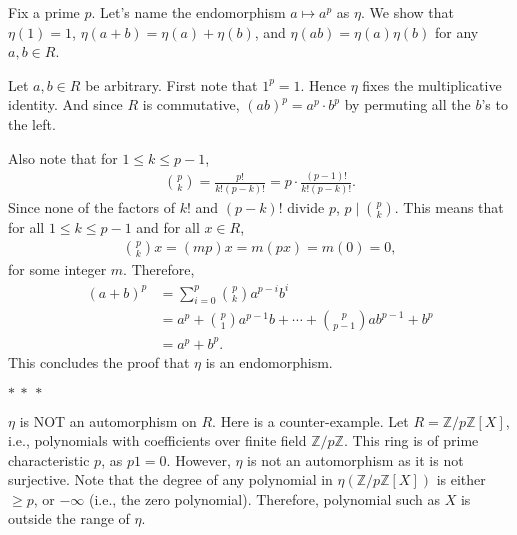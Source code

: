 \documentclass[12pt]{article}
\begin{document}
\begin{fproof}[Jacobson 2.7.4]
  Fix a prime \(p\).
  Let's name the endomorphism \(a \mapsto a^{p}\) as \(\eta\).
  We show that \(\eta(1) = 1\), \(\eta(a+b) = \eta(a)+ \eta(b)\), and \(\eta(ab) = \eta(a)\eta(b)\) for any \(a,b \in R\).

  Let \(a,b \in R\) be arbitrary.
  First note that \(1^p = 1\). Hence \(\eta\) fixes the multiplicative identity.
  And since \(R\) is commutative, \((ab)^p = a^p \cdot b^p\) by permuting all the \(b\)'s to the left.

  Also note that for \(1 \leq k \leq p-1\),
  \begin{align*}
    \binom{p}{k} = \frac{p!}{k!(p-k)!} = p \cdot \frac{(p-1)!}{k!(p-k)!}.
  \end{align*}
  Since none of the factors of \(k!\) and \((p-k)!\) divide \(p\), \(p \mid \binom{p}{k}\). This means that for all \(1 \leq k \leq p-1\) and for all \(x \in R\),
  \begin{align*}
    \binom{p}{k}x = (mp)x = m(px) = m(0) = 0,
  \end{align*}
  for some integer \(m\).
  Therefore,
  \begin{align*}
    (a+b)^p &= \sum_{i=0}^{p} \binom{p}{k} a^{p-i}b^{i}\\
    & = a^p + \binom{p}{1}a^{p-1}b + \cdots + \binom{p}{p-1}ab^{p-1} + b^p\\
    & = a^p + b^p.
  \end{align*}
  This concludes the proof that \(\eta\) is an endomorphism.
  \begin{center}
    \(\ast~\ast~\ast\)
  \end{center}
  \(\eta\) is NOT an automorphism on \(R\). Here is a counter-example.
  Let \(R = \mathbb{Z}/p \mathbb{Z}[X]\), i.e., polynomials with coefficients over finite field \(\mathbb{Z}/p \mathbb{Z}\).
  This ring is of prime characteristic \(p\), as \(p1 = 0\).
  However, \(\eta\) is not an automorphism as it is not surjective.
  Note that the degree of any polynomial in \(\eta(\mathbb{Z}/p \mathbb{Z}[X])\) is either \(\geq p\), or \(-\infty\) (i.e., the zero polynomial). 
  Therefore, polynomial such as \(X\) is outside the range of \(\eta\).

\end{fproof}
\newpage

\begin{fproof}[Jacobson 2.7.9]

\end{fproof}
\newpage

\begin{fproof}[Jacobson 2.7.10]

\end{fproof}
\end{document}
